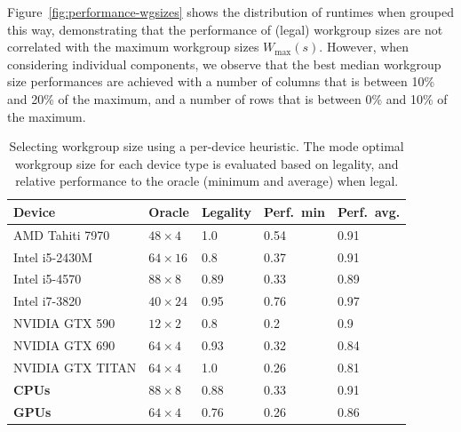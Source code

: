 \documentclass[nonatbib,preprint,9pt]{sigplanconf}
\begin{document}
Figure~\ref{fig:performance-wgsizes} shows the distribution of
runtimes when grouped this way, demonstrating that the performance of
(legal) workgroup sizes are not correlated with the maximum workgroup
sizes $W_{\max}(s)$. However, when considering individual components,
we observe that the best median workgroup size performances are
achieved with a number of columns that is between 10\% and 20\% of the
maximum, and a number of rows that is between 0\% and 10\% of the
maximum.


\begin{table}
  \scriptsize
  \centering
  \begin{tabular}{lllp{.9cm}p{.9cm}}
    \toprule
    Device &         Oracle & Legality & Perf.\ min & Perf.\ avg. \\
    \midrule
    AMD Tahiti 7970 &   $48\times 4$ &      1.0 &       0.54 &        0.91 \\
    Intel i5-2430M &  $64\times 16$ &      0.8 &       0.37 &        0.91 \\
    Intel i5-4570 &   $88\times 8$ &     0.89 &       0.33 &        0.89 \\
    Intel i7-3820 &  $40\times 24$ &     0.95 &       0.76 &        0.97 \\
    NVIDIA GTX 590 &  $12\times 2$ &      0.8 &        0.2 &         0.9 \\
    NVIDIA GTX 690 &   $64\times 4$ &     0.93 &       0.32 &        0.84 \\
    NVIDIA GTX TITAN &   $64\times 4$ &      1.0 &       0.26 &        0.81 \\
    \textbf{CPUs} &   $88\times 8$ &     0.88 &       0.33 &        0.91 \\
    \textbf{GPUs} &   $64\times 4$ &     0.76 &       0.26 &        0.86 \\
    \bottomrule
  \end{tabular}
  \caption[Performance of tuning with a per-device heuristic]{%
    Selecting workgroup size using a per-device heuristic. The mode
    optimal workgroup size for each device type is evaluated
    based on legality, and relative performance to the oracle (minimum
    and average) when legal.%
  }
  \label{tab:heuristic-dev}
\end{table}
\end{document}
